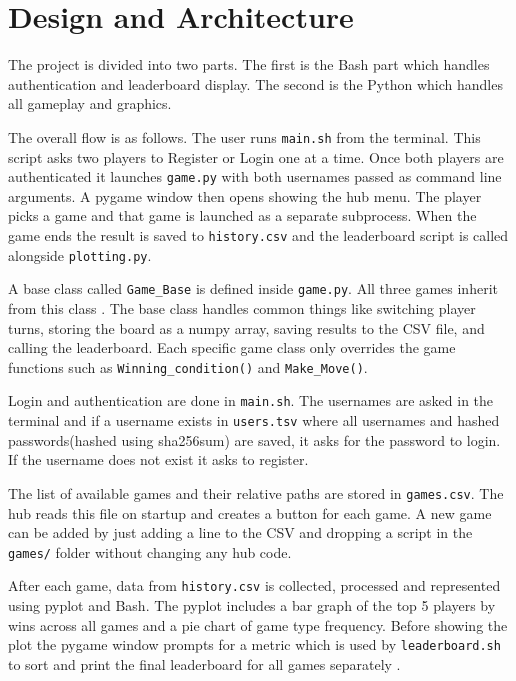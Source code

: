 \documentclass[12pt,a4paper]{article}
\begin{document}
\section{Design and Architecture}
\label{sec:design}

The project is divided into two parts. The first is the Bash part which handles authentication and leaderboard display. The second is the Python  which handles all gameplay and graphics.

The overall flow is as follows. The user runs \texttt{main.sh} from the terminal. This script asks two players to Register or Login one at a time. Once both players are authenticated it launches \texttt{game.py} with both usernames passed as command line arguments. A pygame window then opens showing the hub menu. The player picks a game and that game is launched as a separate subprocess. When the game ends the result is saved to \texttt{history.csv} and the leaderboard script is called alongside \texttt{plotting.py}.

A base class called \texttt{Game\_Base} is defined inside \texttt{game.py}. All three games inherit from this class \cite{pythonoop}. The base class handles common things like switching player turns, storing the board as a numpy array, saving results to the CSV file, and calling the leaderboard. Each specific game class only overrides the game functions such as \texttt{Winning\_condition()} and \texttt{Make\_Move()}.

Login and authentication are done in \texttt{main.sh}. The usernames are asked in the terminal and if a username exists in \texttt{users.tsv} where all usernames and hashed passwords(hashed using sha256sum) are saved, it asks for the password to login. If the username does not exist it asks to register. 

The list of available games and their relative paths are stored in \texttt{games.csv}. The hub reads this file on startup and creates a button for each game. A new game can be added by just adding a line to the CSV and dropping a script in the \texttt{games/} folder without changing any hub code.

After each game, data from \texttt{history.csv} is collected, processed and represented using pyplot and Bash. The pyplot includes a bar graph of the top 5 players by wins across all games and a pie chart of game type frequency. Before showing the plot the pygame window prompts for a metric which is used by \texttt{leaderboard.sh} to sort and print the final leaderboard for all games separately \cite{w3schools}.
\end{document}
